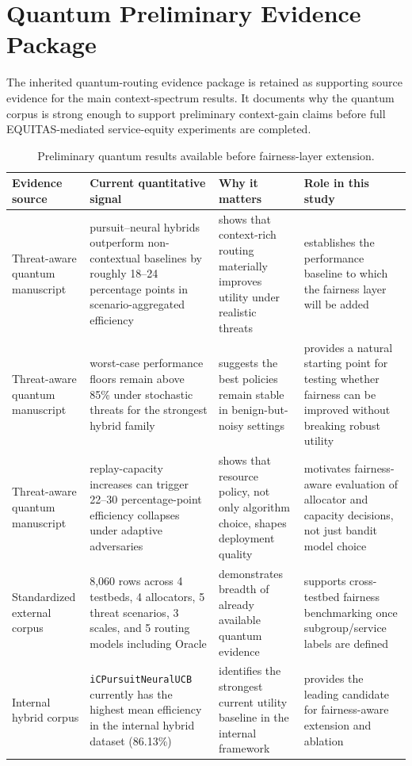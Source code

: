 \documentclass[conference]{IEEEtran}
\begin{document}
\begin{table}[!t]
\section{Quantum Preliminary Evidence Package}
\label{app:quantum_prelim_evidence}
The inherited quantum-routing evidence package is retained as supporting
source evidence for the main context-spectrum results. It documents why the
quantum corpus is strong enough to support preliminary context-gain claims
before full EQUITAS-mediated service-equity experiments are completed.

\caption{Preliminary quantum results available before fairness-layer extension.}
\label{tab:prelim_results}
\centering
\setlength{\tabcolsep}{5pt}
\begin{tabular}{p{}p{}p{}p{}}
\toprule
\textbf{Evidence source} & \textbf{Current quantitative signal} & \textbf{Why it matters} & \textbf{Role in this study} \\
\midrule
Threat-aware quantum manuscript & pursuit--neural hybrids outperform non-contextual baselines by roughly 18--24 percentage points in scenario-aggregated efficiency & shows that context-rich routing materially improves utility under realistic threats & establishes the performance baseline to which the fairness layer will be added \\
Threat-aware quantum manuscript & worst-case performance floors remain above 85\% under stochastic threats for the strongest hybrid family & suggests the best policies remain stable in benign-but-noisy settings & provides a natural starting point for testing whether fairness can be improved without breaking robust utility \\
Threat-aware quantum manuscript & replay-capacity increases can trigger 22--30 percentage-point efficiency collapses under adaptive adversaries & shows that resource policy, not only algorithm choice, shapes deployment quality & motivates fairness-aware evaluation of allocator and capacity decisions, not just bandit model choice \\
Standardized external corpus & 8,060 rows across 4 testbeds, 4 allocators, 5 threat scenarios, 3 scales, and 5 routing models including Oracle & demonstrates breadth of already available quantum evidence & supports cross-testbed fairness benchmarking once subgroup/service labels are defined \\
Internal hybrid corpus & \texttt{iCPursuitNeuralUCB} currently has the highest mean efficiency in the internal hybrid dataset (86.13\%) & identifies the strongest current utility baseline in the internal framework & provides the leading candidate for fairness-aware extension and ablation \\
\bottomrule
\end{tabular}
\end{table}
\end{document}

